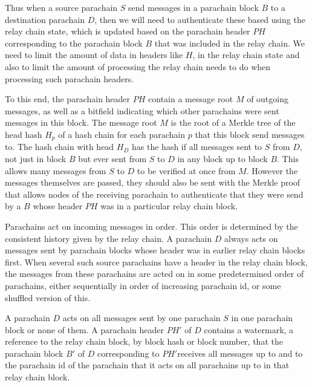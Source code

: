 Thus when a source parachain $S$ send messages in a parachain block $B$ to a destination parachain $D$, then we will need to authenticate these based using the relay chain state, which is updated based on the parachain header $PH$ corresponding to the parachain block $B$ that was included in the relay chain. We need to limit the amount of data in headers like $H$, in the relay chain state and also to limit the amount of processing the relay chain needs to do when processing such parachain headers.

To this end, the parachain header $PH$ contain a message root $M$ of outgoing messages, as well as a bitfield indicating which other parachains were sent messages in this block.
The message root $M$ is the root of a Merkle tree of the head hash $H_p$ of a hash chain for each parachain $p$ that this block send messages to.  The hash chain with head $H_D$ has the hash if all messages sent to $S$ from $D$, not just in block $B$ but ever sent from $S$ to $D$ in any block up to block $B$. This allows many messages from $S$ to $D$  to be verified at once from $M$. However the messages themselves are passed, they should also be sent with the Merkle proof that allows nodes of the receiving parachain
to authenticate that they were send by a $B$ whose header  $PH$ was in a particular relay chain block. 

Parachains act on incoming messages in order. This order is determined by the consistent history given by the relay chain.  A parachain $D$ always acts on messages sent by parachain blocks whose header was in earlier relay chain blocks first. When several such source parachains have a header in the relay chain block, the messages from these parachains are acted on in some predetermined order of parachains, either sequentially in order of increasing parachain id, or some shuffled version of this. 

A parachain $D$ acts on all messages sent by one parachain $S$ in one parachain block or none of them. A parachain header $PH'$ of $D$ contains a watermark, a reference to the relay chain block, by block hash or block number, that the parachain block $B'$ of $D$ corresponding to $PH'$receives all messages up to and to the parachain id of the parachain that it acts on all parachains up to in that relay chain block.

